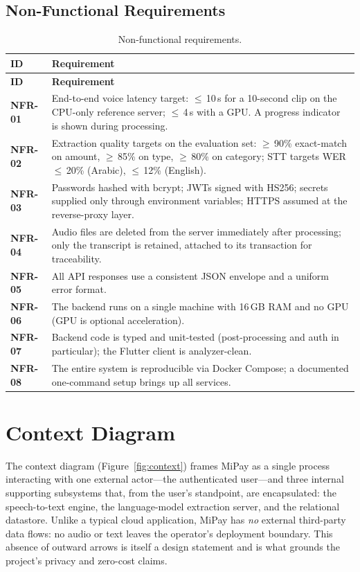 \subsection{Non-Functional Requirements}

\begin{longtable}{>{\bfseries}p{1.7cm} p{12.4cm}}
\caption{Non-functional requirements.}\label{tab:nfr}\\
\toprule
\textbf{ID} & \textbf{Requirement} \\
\midrule
\endfirsthead
\toprule
\textbf{ID} & \textbf{Requirement} \\
\midrule
\endhead
\bottomrule
\endfoot
NFR-01 & End-to-end voice latency target: $\leq$\,10\,s for a 10-second clip on the CPU-only reference server; $\leq$\,4\,s with a GPU. A progress indicator is shown during processing. \\
NFR-02 & Extraction quality targets on the evaluation set: $\geq$\,90\% exact-match on amount, $\geq$\,85\% on type, $\geq$\,80\% on category; STT targets WER $\leq$\,20\% (Arabic), $\leq$\,12\% (English). \\
NFR-03 & Passwords hashed with bcrypt; JWTs signed with HS256; secrets supplied only through environment variables; HTTPS assumed at the reverse-proxy layer. \\
NFR-04 & Audio files are deleted from the server immediately after processing; only the transcript is retained, attached to its transaction for traceability. \\
NFR-05 & All API responses use a consistent JSON envelope and a uniform error format. \\
NFR-06 & The backend runs on a single machine with 16\,GB RAM and no GPU (GPU is optional acceleration). \\
NFR-07 & Backend code is typed and unit-tested (post-processing and auth in particular); the Flutter client is analyzer-clean. \\
NFR-08 & The entire system is reproducible via Docker Compose; a documented one-command setup brings up all services. \\
\end{longtable}

\section{Context Diagram}

The context diagram (Figure~\ref{fig:context}) frames MiPay as a single process
interacting with one external actor---the authenticated user---and three
internal supporting subsystems that, from the user's standpoint, are
encapsulated: the speech-to-text engine, the language-model extraction server,
and the relational datastore. Unlike a typical cloud application, MiPay has
\emph{no} external third-party data flows: no audio or text leaves the operator's
deployment boundary. This absence of outward arrows is itself a design statement
and is what grounds the project's privacy and zero-cost claims.


